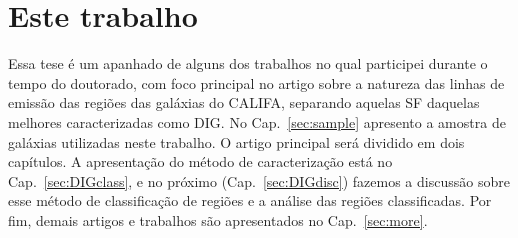 %
%
%
%


\section{Este trabalho}
\label{sec:intro:estetrabalho}

Essa tese é um apanhado de alguns dos trabalhos no qual participei durante o tempo do doutorado, com foco principal no artigo sobre a natureza das linhas de emissão das regiões das galáxias do CALIFA, separando aquelas SF daquelas melhores caracterizadas como DIG. No Cap.\ \ref{sec:sample} apresento a amostra de galáxias utilizadas neste trabalho. O artigo principal será dividido em dois capítulos. A apresentação do método de caracterização está no Cap.\  \ref{sec:DIGclass}, e no próximo (Cap.\ \ref{sec:DIGdisc}) fazemos a discussão sobre esse método de classificação de regiões e a análise das regiões classificadas. Por fim, demais artigos e trabalhos são apresentados no Cap.\ \ref{sec:more}.

